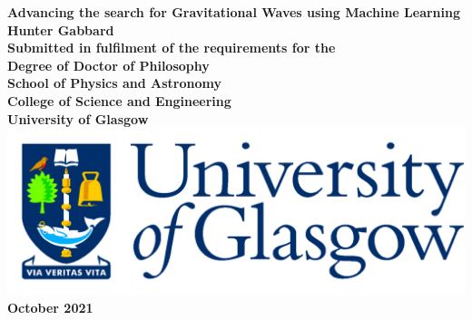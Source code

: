 \documentclass[12pt,titlepage,oneside,nofootinbib,aps,prl,reprint,floatfix,showpacs]{book}
\begin{document}
\begin{titlepage}
\centering
\vspace*{3cm}  %
\bfseries\Large
Advancing the search for Gravitational Waves using Machine Learning \\
\vspace{3cm}
\normalfont\large
Hunter Gabbard\\
\vspace{2cm}
Submitted in fulfilment of the requirements for the\\
Degree of Doctor of Philosophy\\
\vspace{2cm}
School of Physics and Astronomy\\
College of Science and Engineering\\
University of Glasgow\\
\vspace{1cm}
\includegraphics[scale=0.125]{GlaLogo.pdf}
\\
October 2021
\end{titlepage}
\frontmatter  %

\tableofcontents
\listoftables
\listoffigures



\mainmatter %




%

%


%

\backmatter  %
%

%


\end{document}
